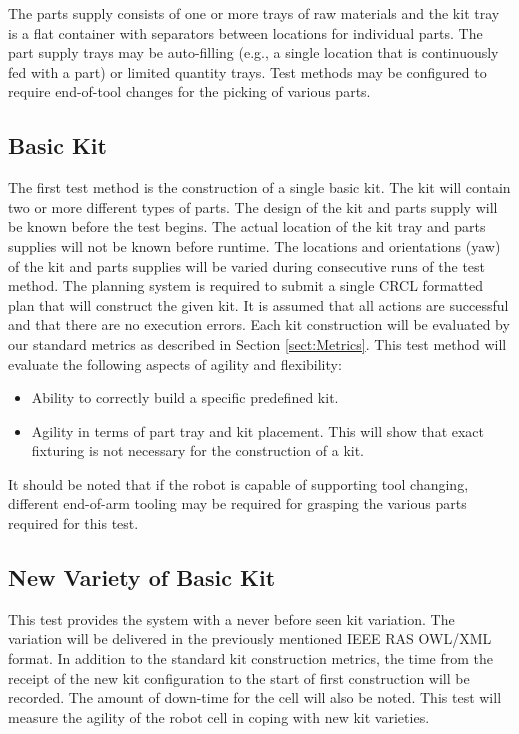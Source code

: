 The parts supply consists of one or more trays of raw materials and
the kit tray is a flat container with separators between locations for individual parts. The part supply trays may be auto-filling (e.g.,
a single location that is continuously fed with a part) or limited quantity trays. Test methods may be configured to require end-of-tool
changes for the picking of various parts.

\subsection{Basic Kit}
The first test method is the construction of a single basic kit. The kit will contain two or more different types of parts. The design of the
kit and parts supply will be known before the test begins. The actual location of the kit tray and parts supplies will not be known before
runtime. The locations and orientations (yaw) of the kit and parts supplies will be varied during consecutive runs of the test method.
The planning system is required to submit a single CRCL formatted plan that will construct the given kit. It is assumed that all
actions are successful and that there are no execution errors.
Each kit construction will be evaluated by our standard metrics as described in Section \ref{sect:Metrics}.
This test method will evaluate the following aspects of agility and flexibility:
\begin{itemize}
	\item Ability to correctly build a specific predefined kit.
	\item Agility in terms of part tray and kit placement. This will show that exact fixturing is not necessary for the construction
	of a kit.
\end{itemize}

It should be noted that if the robot is capable of supporting tool changing, different end-of-arm tooling may be required for grasping
the various parts required for this test.


\subsection{New Variety of Basic Kit}
This test provides the system with a never before seen kit variation. The variation will be delivered in the previously
mentioned IEEE RAS OWL/XML format. In addition to the standard kit construction metrics, the time from the receipt
of the new kit configuration to the start of first construction will be recorded. The amount of down-time for the
cell will also be noted. This test will measure the agility of the robot cell in coping with new kit varieties.

